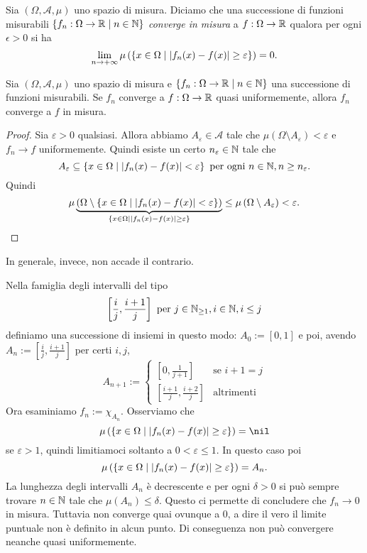 \begin{definizione}
Sia \((\Omega, \mathcal A, \mu)\) uno spazio di misura. Diciamo che una successione di funzioni misurabili \(\left\{f_n : \Omega \to \mathbb R \mid n \in \mathbb N\right\}\) {\em converge in misura} a \(f : \Omega \to \mathbb R\) qualora per ogni \(\epsilon > 0\) si ha
\[\lim_{n \to +\infty} \mu \left( \left\{x \in \Omega \mid \left\lvert f_n(x) - f(x)\right\rvert \ge \varepsilon\right\} \right) = 0 .\]
\end{definizione}

\begin{proposizione}
Sia \((\Omega, \mathcal A, \mu)\) uno spazio di misura e \(\left\{f_n : \Omega \to \mathbb R \mid n \in \mathbb N\right\}\) una successione di funzioni misurabili. Se \(f_n\) converge a \(f : \Omega \to \mathbb R\) quasi uniformemente, allora \(f_n\) converge a \(f\) in misura.
\end{proposizione}

\begin{proof}
Sia \(\varepsilon >0\) qualsiasi. Allora abbiamo \(A_\varepsilon \in \mathcal A\) tale che \(\mu(\Omega \setminus A_\varepsilon) < \varepsilon\) e \(f_n \to f\) uniformemente. Quindi esiste un certo \(n_\varepsilon \in \mathbb N\) tale che
\[A_\varepsilon \subseteq \left\{x \in \Omega \mid \left\lvert f_n(x) - f(x)\right\rvert < \varepsilon\right\} \text{ per ogni } n \in \mathbb N, n \ge n_\varepsilon .\]
Quindi
\[\mu\underbrace{\left(\Omega \setminus \left\{x \in \Omega \mid \left\lvert f_n(x) - f(x)\right\rvert < \varepsilon\right\} \right)}_{\left\{x \in \Omega \mid \left\lvert f_n(x) - f(x)\right\rvert \ge \varepsilon\right\}} \le \mu\left(\Omega \setminus A_\varepsilon\right) < \varepsilon. \qedhere\]
\end{proof}

In generale, invece, non accade il contrario.

\begin{esempio}
Nella famiglia degli intervalli del tipo
\[\left[\frac{i}{j}, \frac{i+1}{j}\right] \text{ per } j \in \mathbb N_{\ge 1}, i \in \mathbb N, i \le j\]
definiamo una successione di insiemi in questo modo: \(A_0 := [0, 1]\) e poi, avendo \(A_n := \left[\frac{i}{j}, \frac{i+1}{j}\right]\) per certi \(i, j\),
\[A_{n+1} := \begin{cases} \left[0, \frac{1}{j+1}\right] & \text{se } i+1=j \\ \left[\frac{i+1}{j}, \frac{i+2}{j}\right] & \text{altrimenti} \end{cases}\]
Ora esaminiamo \(f_n := \chi_{A_n}\). Osserviamo che
\[\mu \left( \set{x \in \Omega \mid \abs{f_n(x) - f(x)} \ge \varepsilon}\right) = \nil\]
se \(\varepsilon > 1\), quindi limitiamoci soltanto a \(0 < \varepsilon \le 1\). In questo caso poi
\[\mu \left( \left\{x \in \Omega \mid \left\lvert f_n(x) - f(x)\right\rvert \ge \varepsilon\right\}\right) = A_n .\]
La lunghezza degli intervalli \(A_n\) è decrescente e per ogni \(\delta > 0\) si può sempre trovare \(n \in \mathbb N\) tale che \(\mu(A_n) \le \delta\). Questo ci permette di concludere che \(f_n \to 0\) in misura. Tuttavia non converge quai ovunque a \(0\), a dire il vero il limite puntuale non è definito in alcun punto. Di conseguenza non può convergere neanche quasi uniformemente.
\end{esempio}

